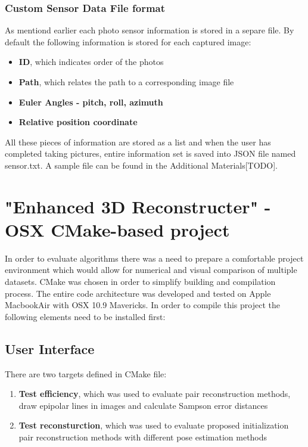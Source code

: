 \subsubsection{Custom Sensor Data File format}
As mentiond earlier each photo sensor information is stored in a separe file. By default the following information is stored for each captured image:
\begin{itemize}
\item \textbf{ID}, which indicates order of the photos
\item \textbf{Path}, which relates the path to a corresponding image file
\item \textbf{Euler Angles - pitch, roll, azimuth}
\item \textbf{Relative position coordinate}
\end{itemize} 
All these pieces of information are stored as a list and when the user has completed taking pictures, entire information set is saved into JSON file named sensor.txt. A sample file can be found in the Additional Materials[TODO].\pagebreak

\section{"Enhanced 3D Reconstructer" - OSX CMake-based project}
In order to evaluate algorithms there was a need to prepare a comfortable project environment which would allow for numerical and visual comparison of multiple datasets. CMake was chosen in order to simplify building and compilation process. The entire code architecture was developed and tested on Apple MacbookAir with OSX 10.9 Mavericks. In order to compile this project the following elements need to be installed first:
\subsection{User Interface}
There are two targets defined in CMake file:
\begin{enumerate}
\item \textbf{Test efficiency}, which was used to evaluate pair reconstruction methods, draw epipolar lines in images and calculate Sampson error distances
\item \textbf{Test reconsturction}, which was used to evaluate proposed initialization pair reconstruction methods with different pose estimation methods
\end{enumerate}
